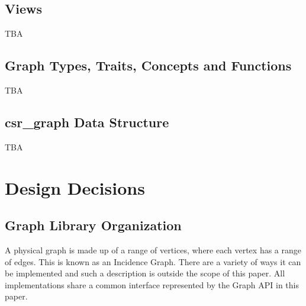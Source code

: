 \documentclass[10pt,onecolumn]{article}
\begin{document}
%

\subsection{Views}
TBA

\subsection{Graph Types, Traits, Concepts and Functions}
TBA

\subsection{csr\_graph Data Structure}
TBA

\section{Design Decisions}
\subsection{Graph Library Organization}
A physical graph is made up of a range of vertices, where each vertex has a range of edges. This is known as an Incidence Graph. There are a variety of 
ways it can be implemented and such a description is outside the scope of this paper. All implementations share a common interface represented by the
Graph API in this paper.
\end{document}
